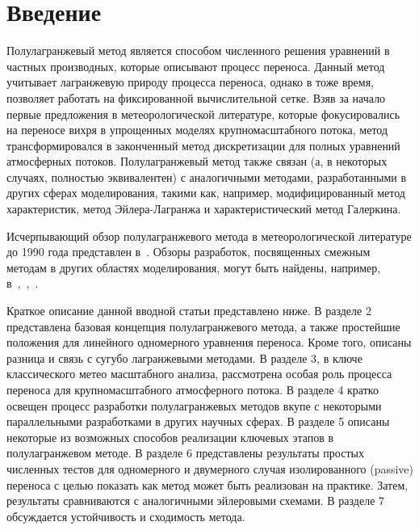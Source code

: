 \chapter{Введение} \label{chapt1}

Полулагранжевый метод является способом численного решения уравнений в частных производных, которые описывают процесс переноса. Данный метод учитывает лагранжевую природу процесса переноса, однако в тоже время, позволяет работать на фиксированной вычислительной сетке. Взяв за начало первые предложения в метеорологической литературе, которые фокусировались на переносе вихря в упрощенных моделях крупномасштабного потока, метод трансформировался в законченный метод дискретизации для полных уравнений атмосферных потоков. Полулагранжевый метод также связан (а, в некоторых случаях, полностью эквивалентен) с аналогичными методами, разработанными в других сферах моделирования, такими как, например, модифицированный метод характеристик, метод Эйлера-Лагранжа и характеристический метод Галеркина. 

Исчерпывающий обзор полулагранжевого метода в метеорологической литературе до 1990 года представлен в~\cite{A67}. Обзоры разработок, посвященных смежным методам в других областях моделирования, могут быть найдены, например, в~\cite{A15},~\cite{A43},~\cite{A56}.

Краткое описание данной вводной статьи представлено ниже. В разделе 2 представлена базовая концепция полулагранжевого метода, а также простейшие положения для линейного одномерного уравнения переноса. Кроме того, описаны разница и связь с сугубо лагранжевыми методами. В разделе 3, в ключе классического метео масштабного анализа, рассмотрена особая роль процесса переноса для крупномасштабного атмосферного потока. В разделе 4 кратко освещен процесс разработки полулагранжевых методов вкупе с некоторыми параллельными разработками в других научных сферах. В разделе 5 описаны некоторые из возможных способов реализации ключевых этапов в полулагранжевом методе. В разделе 6 представлены результаты простых численных тестов для одномерного и двумерного случая изолированного (passive) переноса с целью показать как метод может быть реализован на практике. Затем, результаты сравниваются с аналогичными эйлеровыми схемами. В разделе 7 обсуждается устойчивость и сходимость метода.

